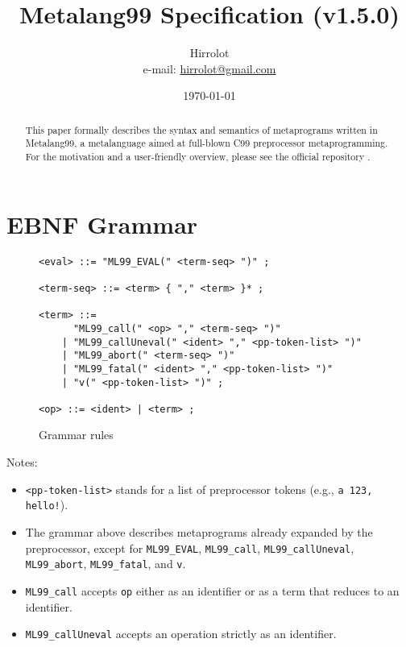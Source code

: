 \documentclass[12pt]{article}
\theoremstyle{break}
\begin{document}
\title{Metalang99 Specification (v1.5.0)}
\date{\today}
\author{Hirrolot \\ e-mail: \href{mailto:hirrolot@gmail.com}{hirrolot@gmail.com}}
\maketitle

\begin{abstract}
This paper formally describes the syntax and semantics of metaprograms written in Metalang99,
a metalanguage aimed at full-blown C99 preprocessor metaprogramming. For the motivation and
a user-friendly overview, please see the official repository \cite{Metalang99}.
\end{abstract}

\tableofcontents

\newpage

\section{EBNF Grammar}

\begin{figure}[H]
    \caption{Grammar rules}

\begin{verbatim}
<eval> ::= "ML99_EVAL(" <term-seq> ")" ;

<term-seq> ::= <term> { "," <term> }* ;

<term> ::=
      "ML99_call(" <op> "," <term-seq> ")"
    | "ML99_callUneval(" <ident> "," <pp-token-list> ")"
    | "ML99_abort(" <term-seq> ")"
    | "ML99_fatal(" <ident> "," <pp-token-list> ")"
    | "v(" <pp-token-list> ")" ;

<op> ::= <ident> | <term> ;
\end{verbatim}

\end{figure}

Notes:

\begin{itemize}
    \item \texttt{<pp-token-list>} stands for a list of preprocessor tokens (e.g., \texttt{a 123, hello!}).
    \item The grammar above describes metaprograms already expanded by the preprocessor,
    except for \texttt{ML99\_EVAL}, \texttt{ML99\_call}, \texttt{ML99\_callUneval}, \\
    \texttt{ML99\_abort}, \texttt{ML99\_fatal}, and \texttt{v}.
    \item \texttt{ML99\_call} accepts \texttt{op} either as an identifier or as a term that
    reduces to an identifier.
    \item \texttt{ML99\_callUneval} accepts an operation strictly as an identifier.
\end{itemize}
\end{document}
